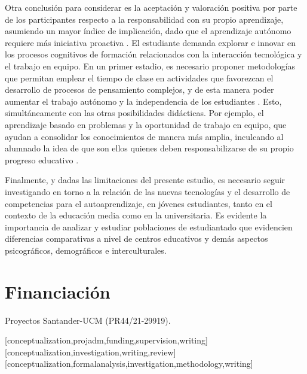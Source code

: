 \documentclass[spanish]{textolivre}
\begin{document}
Otra conclusión para considerar es la aceptación y valoración positiva por parte de los participantes respecto a la responsabilidad con su propio aprendizaje, asumiendo un mayor índice de implicación, dado que el aprendizaje autónomo requiere más iniciativa proactiva \cite{shao_spatio-temporal_2020}. El estudiante demanda explorar e innovar en los procesos cognitivos de formación relacionados con la interacción tecnológica y el trabajo en equipo. En un primer estadio, es necesario proponer metodologías que permitan emplear el tiempo de clase en actividades que favorezcan el desarrollo de procesos de pensamiento complejos, y de esta manera poder aumentar el trabajo autónomo y la independencia de los estudiantes \cite{suryawan_development_2021}. Esto, simultáneamente con las otras posibilidades didácticas. Por ejemplo, el aprendizaje basado en problemas y la oportunidad de trabajo en equipo, que ayudan a consolidar los conocimientos de manera más amplia, inculcando al alumnado la idea de que son ellos quienes deben responsabilizarse de su propio progreso educativo \cite{pinats_autoaprendizaje:_2023}.

Finalmente, y dadas las limitaciones del presente estudio, es necesario seguir investigando en torno a la relación de las nuevas tecnologías y el desarrollo de competencias para el autoaprendizaje, en jóvenes estudiantes, tanto en el contexto de la educación media como en la universitaria. Es evidente la importancia de analizar y estudiar poblaciones de estudiantado que evidencien diferencias comparativas a nivel de centros educativos y demás aspectos psicográficos, demográficos e interculturales.  

\section{Financiación}
Proyectos Santander-UCM (PR44/21-29919).

\printbibliography\label{sec-bib}
\begin{contributors}
[conceptualization,projadm,funding,supervision,writing]
[conceptualization,investigation,writing,review]
[conceptualization,formalanalysis,investigation,methodology,writing]
\end{contributors}
\end{document}
